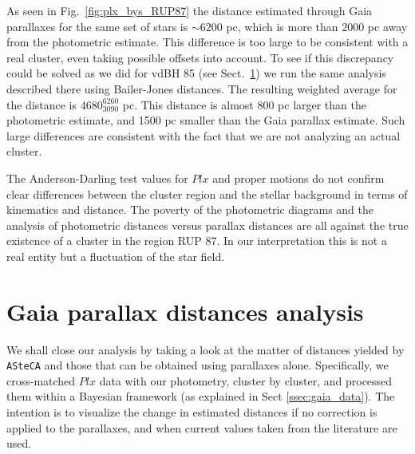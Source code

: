 \documentclass[draft]{aa}
\begin{document}
As seen in Fig.~\ref{fig:plx_bys_RUP87} the distance estimated through
Gaia parallaxes for the same set of stars is $\sim6200$ pc, which is more
than 2000 pc away from the photometric estimate. This difference is too large to
be consistent with a real cluster, even taking possible offsets into account.
To see if this discrepancy could be solved as we did for vdBH 85 (see
Sect.~\ref{sec:gaia_distances}) we run the same analysis described there using
Bailer-Jones distances. The resulting weighted average for the
distance is $4680_{3090}^{6260}$ pc. This distance is almost 800 pc larger
than the photometric estimate, and 1500 pc smaller than the Gaia parallax
estimate. Such large differences are consistent with the fact that we are not
analyzing an actual cluster.

The Anderson-Darling test values for $Plx$ and proper motions do not confirm
clear differences between the cluster region and the stellar background in
terms of kinematics and distance. The poverty of the photometric diagrams and
the analysis of photometric distances versus parallax distances
are all against the true existence of a cluster in the region RUP 87.
In our interpretation this is not a real entity but a fluctuation of the star
field.





\section{Gaia parallax distances analysis}
\label{sec:gaia_distances}

We shall close our analysis by taking a look at the matter of distances yielded
by \texttt{ASteCA} and those that can be obtained using parallaxes alone.
Specifically, we cross-matched $Plx$ data with our photometry, cluster by
cluster, and processed them within a Bayesian framework (as explained in Sect
\ref{ssec:gaia_data}). The intention is to visualize the change in estimated
distances if no correction is applied to the parallaxes, and when current
values taken from the literature are used.\\
\end{document}
